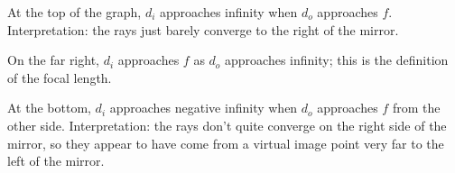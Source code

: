 At the top of the graph, $d_i$ approaches infinity when $d_o$ approaches $f$. Interpretation:
the rays just barely converge to the right of the mirror.

On the far right, $d_i$ approaches
$f$ as $d_o$ approaches infinity; this is the definition of the focal length.

At the bottom, $d_i$ approaches negative infinity when $d_o$ approaches $f$ from the
other side. Interpretation: the rays don't quite converge on the right side of the mirror,
so they appear to have come from a virtual image point very far to the left of the
mirror.



